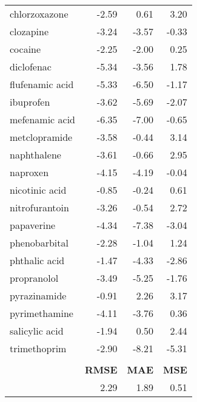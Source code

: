 \documentclass[twoside,twocolumn,9pt]{article}
\begin{document}
\begin{table}[ht]
\begin{tabular*}{0.48\textwidth}{@{\extracolsep{\fill}}lrrr}
    chlorzoxazone         & -2.59 &  0.61 &  3.20\\
    clozapine             & -3.24 & -3.57 & -0.33\\
    cocaine               & -2.25 & -2.00 &  0.25\\
    diclofenac            & -5.34 & -3.56 &  1.78\\
    flufenamic acid       & -5.33 & -6.50 & -1.17\\
    ibuprofen             & -3.62 & -5.69 & -2.07\\
    mefenamic acid        & -6.35 & -7.00 & -0.65\\
    metclopramide         & -3.58 & -0.44 &  3.14\\
    naphthalene           & -3.61 & -0.66 &  2.95\\
    naproxen              & -4.15 & -4.19 & -0.04\\
    nicotinic acid        & -0.85 & -0.24 &  0.61\\
    nitrofurantoin        & -3.26 & -0.54 &  2.72\\
    papaverine            & -4.34 & -7.38 & -3.04\\
    phenobarbital         & -2.28 & -1.04 &  1.24\\
    phthalic acid         & -1.47 & -4.33 & -2.86\\
    propranolol           & -3.49 & -5.25 & -1.76\\
    pyrazinamide          & -0.91 &  2.26 &  3.17\\
    pyrimethamine         & -4.11 & -3.76 &  0.36\\
    salicylic acid        & -1.94 &  0.50 &  2.44\\
    trimethoprim          & -2.90 & -8.21 & -5.31\\
    \hline
    {} & {} & {} & {}\\
    {} & \textbf{RMSE} & \textbf{MAE} & \textbf{MSE}\\
    {} & 2.29 & 1.89 & 0.51\\
    \hline
  \end{tabular*}
\end{table}
\end{document}

